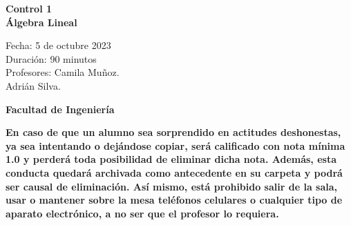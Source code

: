 \documentclass[a4paper]{article}
\begin{document}
\thispagestyle{fancy}
\vspace*{1cm}

\begin{minipage}[r]{12cm}
    \begin{flushright}
    \end{flushright}
\end{minipage}

\begin{center}
\Large{\textbf{Control 1\\ Álgebra Lineal\\ }}
\end{center}
\vspace{1cm}
\begin{minipage}[r]{15cm}
\begin{flushleft}

Fecha: 5 de octubre 2023 \\%
Duración: 90 minutos  \\
Profesores: Camila Muñoz.\\\hspace{1.7cm} Adrián Silva.\\
\end{flushleft}
\end{minipage}
\vspace{2cm}
\begin{center}
\Large{\textbf{Facultad de Ingeniería}}
\end{center}
\vspace{1cm}
\textbf{En caso de que un alumno sea sorprendido en actitudes deshonestas, ya sea intentando o
dejándose copiar, será calificado con nota mínima 1.0 y perderá toda posibilidad de eliminar
dicha nota. Además, esta conducta quedará archivada como antecedente en su carpeta y
podrá ser causal de eliminación.
Así mismo, está prohibido salir de la sala, usar o mantener sobre la mesa teléfonos celulares
o cualquier tipo de aparato electrónico, a no ser que el profesor lo requiera.}\\



\vspace{5cm}
\newpage
\thispagestyle{empty}
\end{document}
